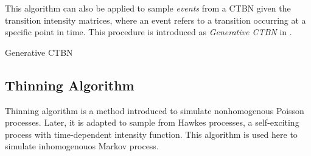 This algorithm can also be applied to sample \textit{events} from a CTBN given the transition intensity matrices, where an event refers to a transition occurring at a specific point in time. This procedure is introduced as \textit{Generative CTBN} in \cite{Nodelman1995}.


\begin{algorithm}[H]
	
	
	\begin{algorithmic}[1]
		\ENDWHILE
	\end{algorithmic}
	\caption{Generative CTBN}
	\label{alg:generative_ctbn}
\end{algorithm}

\subsection{Thinning Algorithm}
Thinning algorithm is a method introduced to simulate nonhomogenous Poisson processes. \cite{Lewis1979} Later, it is adapted to sample from Hawkes processes, a self-exciting process with time-dependent intensity function. \cite{Ogaata1981, Rizoiu2017} This algorithm is used here to simulate inhomogenouos Markov process.

